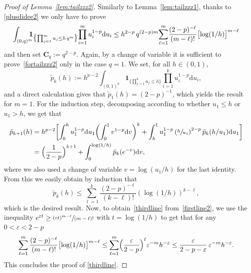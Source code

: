 \documentclass[JEP,XML,SOM,Unicode,published]{cedram}
\theoremstyle{definition}
\newcommand{\dd}{\mathrm{d}}
\newcommand{\ind}{\mathbf{1}}
\newcommand{\bC}{{\ensuremath{\mathbf C}} }
\let\gep\varepsilon
\begin{document}
\begin{proof}[Proof of Lemma~\ref{lem:tailzzz2}]
Similarly to Lemma~\ref{lem:tailzzz1},
thanks to \eqref{plusdidee2} we only have to prove
\begin{equation}
\label{fortailzzz2}
\int_{(0,q)^m}\hspace*{-2.5mm} \ind_{\bigl\{\prod^m_{j=1}u_j \le h\, q^m\bigr\}}\! \prod_{i=1}^m u^{1-p}_i \dd u_i \le h^{2-p} \, q^{(2-p)m}\!\sum_{\ell=1}^{m}\!\frac{(2-p)^{-\ell}}{(m-\ell)!} \bigl[\log (1/h)\bigr]^{m-\ell}
\end{equation}
and then set $\bC_q := q^{2-p}$.
Again, by a change of variable it is sufficient to prove~\eqref{fortailzzz2} only in the case $q=1$.
We set, for all $h\in (0,1)$,
\begin{equation*}
\tilde p_k(h):= h^{p-2}\int_{(0,1)^k}
\ind_{\bigl\{\prod^k_{j=1}u_j \le h\bigr\}} \prod_{i=1}^k u^{1-p}_i \dd u_i,
\end{equation*}
and a direct calculation gives that $\tilde p_1(h)=(2-p)^{-1}$,
which yields the result for $m=1$.
For the induction step, decomposing according to whether $u_1 \leq h$ or $u_1>h$, we get that
\begin{align*}
\tilde p_{k+1}(h) &= h^{p-2} \biggl[ \int^{h}_0 u_1^{1-p}\dd u_1 \biggl(\int_{0}^1 v^{1-p}\dd v\biggr)^k + \int^1_{h} u_1^{1-p}\left(\sfrac{h}{u_1} \right)^{2-p} \tilde p_k(h/u_1) \dd u_1 \biggr] \\
& = \Bigl(\frac{1}{2-p}\Bigr)^{k+1}+ \int_0^{\log(1/h)} \tilde p_k(e^{-v}) \dd v,
\end{align*}
where we also used a change of variable $v=\log(u_1/h)$ for the last identity.
From this we easily obtain by induction
that
\begin{equation*}
\tilde p_k(h) \le \sum_{\ell=1}^{k} \frac{(2-p)^{-\ell}}{(k-\ell)!} (\log (1/h))^{k-\ell},
\end{equation*}
which is the desired result.
Now, to obtain~\eqref{thirdline} from~\eqref{firstline2}, we use the inequality $e^{\gep t} \geq \sfrac{(\gep t)^{m-\ell}}{(m-\ell)!}$ with $t=\log (1/h)$ to get that for any $0<\gep<2-p$
\begin{equation}
\sum_{\ell=1}^{m}\frac{(2-p)^{-\ell}}{(m-\ell)!} \bigl[\log (1/h)\bigr]^{m-\ell} \le \sum_{\ell=1}^{ m} \Bigl(\frac{\gep}{2-p}\Bigr)^{\ell} \gep^{ -m} h^{-\gep} \le \frac{\gep}{ 2-p-\gep}\, \gep^{ -m} h^{-\gep}.
\end{equation}
This concludes the proof of \eqref{thirdline}.
\end{proof}
\end{document}
